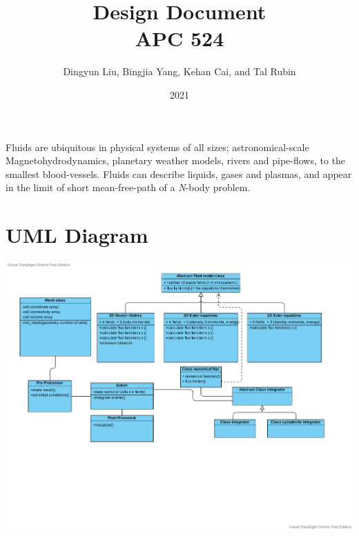 \documentclass[aip, amsmath, amssymb, preprint,floatfix]{revtex4-2}
\begin{document}
\title{Design Document\\APC 524}
\date{2021}

\author{Dingyun Liu, Bingjia Yang, Kehan Cai, and Tal Rubin}
\maketitle



Fluids are ubiquitous in physical systems of all sizes; astronomical-scale Magnetohydrodynamics, planetary weather models, rivers and pipe-flows, to the smallest blood-vessels. Fluids can describe liquids, gases and plasmas, and appear in the limit of short mean-free-path of a \textit{N}-body problem.




\section{UML Diagram}
\includegraphics[width = \linewidth]{APC524UML.pdf}


\end{document}
